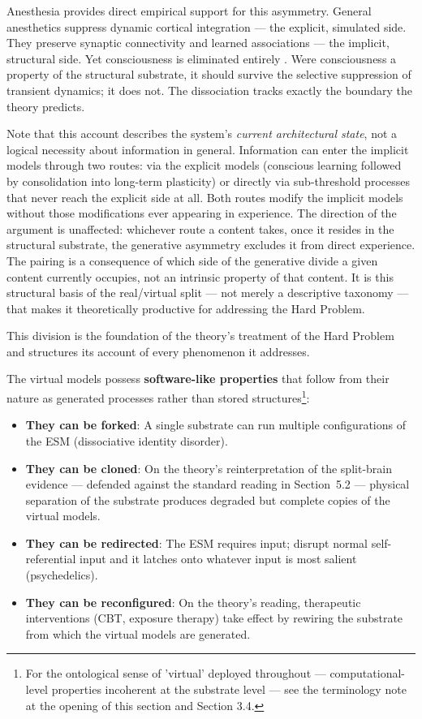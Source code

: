 \documentclass[12pt]{article}
\begin{document}
Anesthesia provides direct empirical support for this asymmetry. General anesthetics suppress dynamic cortical integration --- the explicit, simulated side. They preserve synaptic connectivity and learned associations --- the implicit, structural side. Yet consciousness is eliminated entirely \citep{AlkireHudetzTononi2008}. Were consciousness a property of the structural substrate, it should survive the selective suppression of transient dynamics; it does not. The dissociation tracks exactly the boundary the theory predicts.

Note that this account describes the system's \emph{current architectural state}, not a logical necessity about information in general. Information can enter the implicit models through two routes: via the explicit models (conscious learning followed by consolidation into long-term plasticity) or directly via sub-threshold processes that never reach the explicit side at all. Both routes modify the implicit models without those modifications ever appearing in experience. The direction of the argument is unaffected: whichever route a content takes, once it resides in the structural substrate, the generative asymmetry excludes it from direct experience. The pairing is a consequence of which side of the generative divide a given content currently occupies, not an intrinsic property of that content. It is this structural basis of the real/virtual split --- not merely a descriptive taxonomy --- that makes it theoretically productive for addressing the Hard Problem.

This division is the foundation of the theory's treatment of the Hard Problem and structures its account of every phenomenon it addresses.

The virtual models possess \textbf{software-like properties} that follow from their nature as generated processes rather than stored structures\footnote{For the ontological sense of 'virtual' deployed throughout --- computational-level properties incoherent at the substrate level --- see the terminology note at the opening of this section and Section 3.4.}:

\begin{itemize}
\item \textbf{They can be forked}: A single substrate can run multiple configurations of the ESM (dissociative identity disorder).
\item \textbf{They can be cloned}: On the theory's reinterpretation of the split-brain evidence --- defended against the standard reading in Section~5.2 --- physical separation of the substrate produces degraded but complete copies of the virtual models.
\item \textbf{They can be redirected}: The ESM requires input; disrupt normal self-referential input and it latches onto whatever input is most salient (psychedelics).
\item \textbf{They can be reconfigured}: On the theory's reading, therapeutic interventions (CBT, exposure therapy) take effect by rewiring the substrate from which the virtual models are generated.
\end{itemize}
\end{document}
